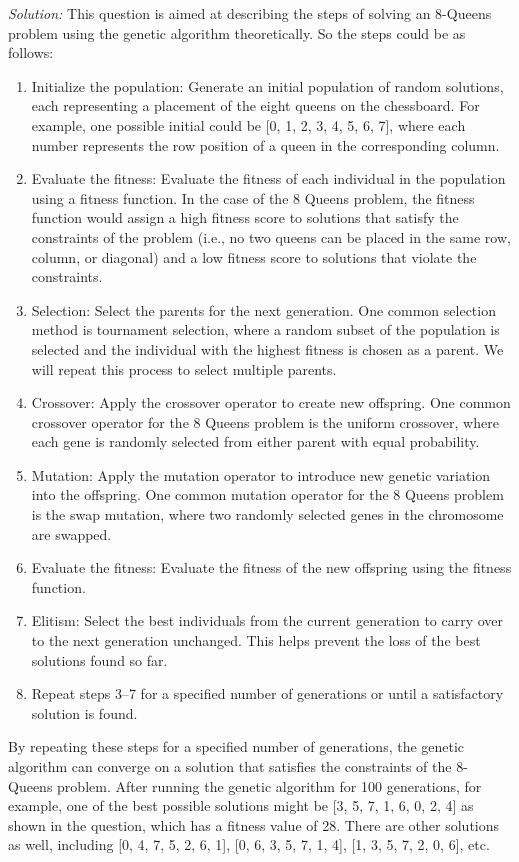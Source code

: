 \documentclass[a4paper, 11pt]{article}
\newenvironment{solution}
    {\textit{Solution:}}
    {}
\begin{document}
{\begin{solution}
	This question is aimed at describing the steps of solving an 8-Queens problem using the genetic algorithm theoretically. So the steps could be as follows:
	\begin{enumerate}
		\item Initialize the population: Generate an initial population of random solutions, each representing a placement of the eight queens on the chessboard. For example, one possible initial could be [0, 1, 2, 3, 4, 5, 6, 7], where each number represents the row position of a queen in the corresponding column.
		\item Evaluate the fitness: Evaluate the fitness of each individual in the population using a fitness function. In the case of the 8 Queens problem, the fitness function would assign a high fitness score to solutions that satisfy the constraints of the problem (i.e., no two queens can be placed in the same row, column, or diagonal) and a low fitness score to solutions that violate the constraints.
		\item Selection: Select the parents for the next generation. One common selection method is tournament selection, where a random subset of the population is selected and the individual with the highest fitness is chosen as a parent. We will repeat this process to select multiple parents.
		\item Crossover: Apply the crossover operator to create new offspring. One common crossover operator for the 8 Queens problem is the uniform crossover, where each gene is randomly selected from either parent with equal probability.	
		\item Mutation: Apply the mutation operator to introduce new genetic variation into the offspring. One common mutation operator for the 8 Queens problem is the swap mutation, where two randomly selected genes in the chromosome are swapped.
		\item Evaluate the fitness: Evaluate the fitness of the new offspring using the fitness function.
		\item Elitism: Select the best individuals from the current generation to carry over to the next generation unchanged. This helps prevent the loss of the best solutions found so far.
		\item Repeat steps 3–7 for a specified number of generations or until a satisfactory solution is found.
	\end{enumerate}
	By repeating these steps for a specified number of generations, the genetic algorithm can converge on a solution that satisfies the constraints of the 8-Queens problem. After running the genetic algorithm for 100 generations, for example, one of the best possible solutions might be [3, 5, 7, 1, 6, 0, 2, 4] as shown in the question, which has a fitness value of 28. There are other solutions as well, including [0, 4, 7, 5, 2, 6, 1], [0, 6, 3, 5, 7, 1, 4], [1, 3, 5, 7, 2, 0, 6], etc.

\end{solution}}
\end{document}
